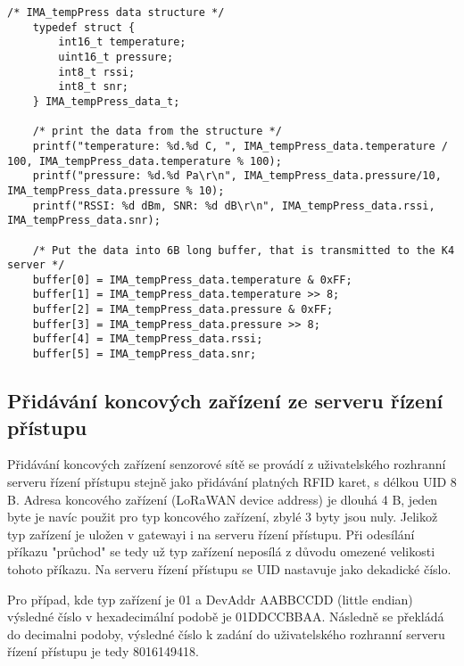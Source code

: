 \begin{lstlisting}[style=CStyle]
    /* IMA_tempPress data structure */   
    typedef struct {
        int16_t temperature;
        uint16_t pressure;
        int8_t rssi;
        int8_t snr;
    } IMA_tempPress_data_t;
     
    /* print the data from the structure */
    printf("temperature: %d.%d C, ", IMA_tempPress_data.temperature / 100, IMA_tempPress_data.temperature % 100);
    printf("pressure: %d.%d Pa\r\n", IMA_tempPress_data.pressure/10, IMA_tempPress_data.pressure % 10);
    printf("RSSI: %d dBm, SNR: %d dB\r\n", IMA_tempPress_data.rssi, IMA_tempPress_data.snr);

    /* Put the data into 6B long buffer, that is transmitted to the K4 server */
    buffer[0] = IMA_tempPress_data.temperature & 0xFF;
    buffer[1] = IMA_tempPress_data.temperature >> 8;
    buffer[2] = IMA_tempPress_data.pressure & 0xFF;
    buffer[3] = IMA_tempPress_data.pressure >> 8;
    buffer[4] = IMA_tempPress_data.rssi;
    buffer[5] = IMA_tempPress_data.snr;
\end{lstlisting}


\subsection{Přidávání koncových zařízení ze serveru řízení přístupu}
Přidávání koncových zařízení senzorové sítě se provádí z uživatelského rozhranní serveru řízení přístupu stejně jako přidávání platných RFID karet, s délkou UID 8 B.
Adresa koncového zařízení (LoRaWAN device address) je dlouhá 4 B, jeden byte je navíc použit pro typ koncového zařízení, zbylé 3 byty jsou nuly.
Jelikož typ zařízení je uložen v gatewayi i na serveru řízení přístupu. Při odesílání příkazu "průchod" se tedy už typ zařízení neposílá z důvodu omezené velikosti tohoto příkazu.
Na serveru řízení přístupu se UID nastavuje jako dekadické číslo.

Pro případ, kde typ zařízení je 01 a DevAddr AABBCCDD (little endian) výsledné číslo v hexadecimální podobě je 01DDCCBBAA. Následně se překládá do decimalni podoby, výsledné číslo k zadání do uživatelského rozhranní serveru řízení přístupu je tedy 8016149418.




